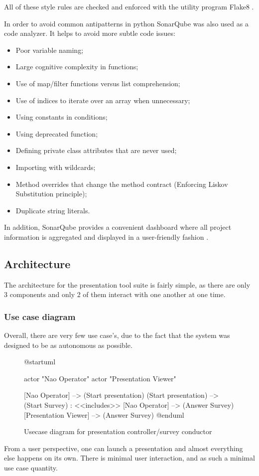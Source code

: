 \documentclass[12pt, fleqn, a4paper]{article}
\begin{document}
All of these style rules are checked and enforced with the utility program Flake8 \citep{flake8}.\par
In order to avoid common antipatterns in python SonarQube was also used as a code analyzer. It helps to avoid more subtle code issues:
\begin{itemize}
	\item Poor variable naming;
	\item Large cognitive complexity in functions;
	\item Use of map/filter functions versus list comprehension;
	\item Use of indices to iterate over an array when unnecessary;
	\item Using constants in conditions;
	\item Using deprecated function;
	\item Defining private class attributes that are never used;
	\item Importing with wildcards;
	\item Method overrides that change the method contract (Enforcing Liskov Substitution principle);
	\item Duplicate string literals.
\end{itemize}
In addition, SonarQube provides a convenient dashboard where all project information is aggregated and displayed in a user-friendly fashion \citep{sonarqube}.
\subsection{Architecture}
The architecture for the presentation tool suite is fairly simple, as there are only 3 components and only 2 of them interact with one another at one time.
\subsubsection{Use case diagram}
Overall, there are very few use case's, due to the fact that the system was designed to be as autonomous as possible.
\begin{figure}[H]
	\centering
	\begin{plantuml}
@startuml

actor "Nao Operator"
actor "Presentation Viewer"

[Nao Operator] --> (Start presentation)
(Start presentation) --> (Start Survey) : <<includes>>
[Nao Operator] --> (Answer Survey)
[Presentation Viewer] --> (Answer Survey)
@enduml
	\end{plantuml}
	\caption{Usecase diagram for presentation controller/survey conductor}
\end{figure}
From a user perspective, one can launch a presentation and almost everything else happens on its own. There is minimal user interaction, and as such a minimal use case quantity.
\end{document}
